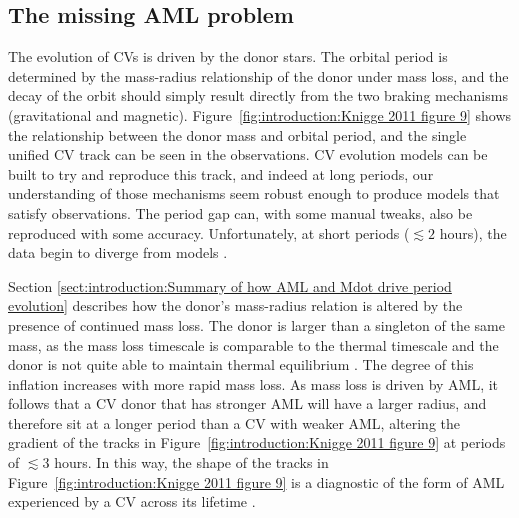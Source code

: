 

\subsection{The missing AML problem}
\label{sect:introduction:the missing aml problem}

The evolution of CVs is driven by the donor stars. The orbital period is determined by the mass-radius relationship of the donor under mass loss, and the decay of the orbit should simply result directly from the two braking mechanisms (gravitational and magnetic). Figure~\ref{fig:introduction:Knigge 2011 figure 9} shows the relationship between the donor mass and orbital period, and the single unified CV track can be seen in the observations. CV evolution models can be built to try and reproduce this track, and indeed at long periods, our understanding of those mechanisms seem robust enough to produce models that satisfy observations. The period gap can, with some manual tweaks, also be reproduced with some accuracy. Unfortunately, at short periods ($\lesssim 2$ hours), the data begin to diverge from models \citep{knigge2006,knigge11}.

Section \ref{sect:introduction:Summary of how AML and Mdot drive period evolution} describes how the donor's mass-radius relation is altered by the presence of continued mass loss. The donor is larger than a singleton of the same mass, as the mass loss timescale is comparable to the thermal timescale and the donor is not quite able to maintain thermal equilibrium \citep{knigge11}. The degree of this inflation increases with more rapid mass loss. As mass loss is driven by AML, it follows that a CV donor that has stronger AML will have a larger radius, and therefore sit at a longer period than a CV with weaker AML, altering the gradient of the tracks in Figure~\ref{fig:introduction:Knigge 2011 figure 9} at periods of $\lesssim 3$ hours. In this way, the shape of the tracks in Figure~\ref{fig:introduction:Knigge 2011 figure 9} is a diagnostic of the form of AML experienced by a CV across its lifetime \citep{knigge11}.


